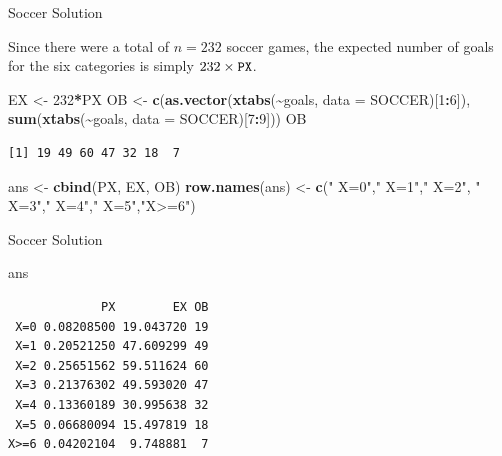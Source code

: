 \documentclass[
  ignorenonframetext,
]{beamer}
\newenvironment{Shaded}{\begin{snugshade}}{\end{snugshade}}
\newcommand{\AttributeTok}[1]{\textcolor[rgb]{0.13,0.29,0.53}{#1}}
\newcommand{\DecValTok}[1]{\textcolor[rgb]{0.00,0.00,0.81}{#1}}
\newcommand{\FunctionTok}[1]{\textcolor[rgb]{0.13,0.29,0.53}{\textbf{#1}}}
\newcommand{\NormalTok}[1]{#1}
\newcommand{\OtherTok}[1]{\textcolor[rgb]{0.56,0.35,0.01}{#1}}
\newcommand{\SpecialCharTok}[1]{\textcolor[rgb]{0.81,0.36,0.00}{\textbf{#1}}}
\newcommand{\StringTok}[1]{\textcolor[rgb]{0.31,0.60,0.02}{#1}}
\begin{document}
\begin{frame}[fragile]{Soccer Solution}
\label{soccer-solution-2}
\begin{tcolorbox}
Since there were a total of $n=232$ soccer games, the expected
number of goals for the six categories is simply $232 \times
\tt{PX}$.
\end{tcolorbox}

\begin{Shaded}
\begin{Highlighting}[]
\NormalTok{EX }\OtherTok{\textless{}{-}} \DecValTok{232}\SpecialCharTok{*}\NormalTok{PX}
\NormalTok{OB }\OtherTok{\textless{}{-}} \FunctionTok{c}\NormalTok{(}\FunctionTok{as.vector}\NormalTok{(}\FunctionTok{xtabs}\NormalTok{(}\SpecialCharTok{\textasciitilde{}}\NormalTok{goals, }\AttributeTok{data =}\NormalTok{ SOCCER)[}\DecValTok{1}\SpecialCharTok{:}\DecValTok{6}\NormalTok{]), }
        \FunctionTok{sum}\NormalTok{(}\FunctionTok{xtabs}\NormalTok{(}\SpecialCharTok{\textasciitilde{}}\NormalTok{goals, }\AttributeTok{data =}\NormalTok{ SOCCER)[}\DecValTok{7}\SpecialCharTok{:}\DecValTok{9}\NormalTok{]))}
\NormalTok{OB}
\end{Highlighting}
\end{Shaded}

\begin{verbatim}
[1] 19 49 60 47 32 18  7
\end{verbatim}

\begin{Shaded}
\begin{Highlighting}[]
\NormalTok{ans }\OtherTok{\textless{}{-}} \FunctionTok{cbind}\NormalTok{(PX, EX, OB)}
\FunctionTok{row.names}\NormalTok{(ans) }\OtherTok{\textless{}{-}} \FunctionTok{c}\NormalTok{(}\StringTok{" X=0"}\NormalTok{,}\StringTok{" X=1"}\NormalTok{,}\StringTok{" X=2"}\NormalTok{, }
                    \StringTok{" X=3"}\NormalTok{,}\StringTok{" X=4"}\NormalTok{,}\StringTok{" X=5"}\NormalTok{,}\StringTok{"X\textgreater{}=6"}\NormalTok{)}
\end{Highlighting}
\end{Shaded}
\end{frame}

\begin{frame}[fragile]{Soccer Solution}
\label{soccer-solution-3}
\begin{Shaded}
\begin{Highlighting}[]
\NormalTok{ans}
\end{Highlighting}
\end{Shaded}

\begin{verbatim}
             PX        EX OB
 X=0 0.08208500 19.043720 19
 X=1 0.20521250 47.609299 49
 X=2 0.25651562 59.511624 60
 X=3 0.21376302 49.593020 47
 X=4 0.13360189 30.995638 32
 X=5 0.06680094 15.497819 18
X>=6 0.04202104  9.748881  7
\end{verbatim}
\end{frame}
\end{document}
